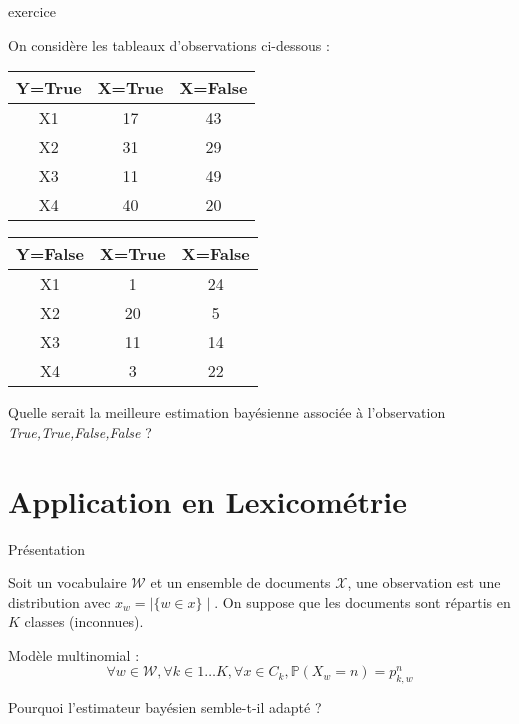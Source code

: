 \documentclass[11pt]{beamer}
\begin{document}
\begin{frame}{exercice}

On considère les tableaux d'observations ci-dessous :\\

\vspace{0.2cm}

\begin{center}

\begin{tabular}{|c|c|c|}
\hline
Y=True & X=True & X=False\\
\hline
X1 & 17& 43\\
X2 & 31 & 29\\
X3 & 11& 49\\
X4 & 40 & 20\\  
\hline
\end{tabular}

\begin{tabular}{|c|c|c|}
\hline
Y=False & X=True & X=False\\
\hline
X1 & 1& 24\\
X2 & 20 & 5\\
X3 & 11& 14\\
X4 & 3 & 22\\  
\hline
\end{tabular}

\end{center}

Quelle serait la meilleure estimation bayésienne associée à l'observation \textit{True,True,False,False} ?

\end{frame}

\section{Application en Lexicométrie}

\begin{frame}{Présentation}

Soit un vocabulaire $\mathcal{W}$ et un ensemble de documents $\mathcal{X}$, une observation est une distribution avec $x_w = \mid\{w \in x\}\mid$. On suppose que les documents sont répartis en $K$ classes (inconnues).

\pause

\vspace{0.3cm}

Modèle multinomial :\\

$$\forall w \in \mathcal{W},\forall k \in 1\ldots K, \forall x \in C_k, \mathbb{P}(X_w=n) = p_{k,w}^n$$

\pause
\vspace{0.3cm}

Pourquoi l'estimateur bayésien semble-t-il adapté ?

\end{frame}
\end{document}
